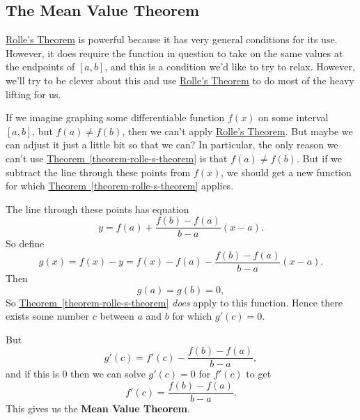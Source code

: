 \documentclass[10pt,]{book}
\newcommand{\terminology}[1]{\textbf{#1}}
\numberwithin{equation}{section}
\begin{document}
\subsection[{The Mean Value Theorem}]{The Mean Value Theorem}\label{subsection-the-mean-value-theorem}
\hypertarget{p-334}{}%
\hyperref[theorem-rolle-s-theorem]{Rolle's Theorem} is powerful because it has very general conditions for its use. However, it does require the function in question to take on the same values at the endpoints of \([a,b]\), and this is a condition we'd like to try to relax. However, we'll try to be clever about this and use \hyperref[theorem-rolle-s-theorem]{Rolle's Theorem} to do most of the heavy lifting for us.%
\par
\hypertarget{p-335}{}%
If we imagine graphing some differentiable function \(f(x)\) on some interval \([a,b]\), but \(f(a)\neq f(b)\), then we can't apply \hyperref[theorem-rolle-s-theorem]{Rolle's Theorem}. But maybe we can adjust it just a little bit so that we can? In particular, the only reason we can't use \hyperref[theorem-rolle-s-theorem]{Theorem~\ref{theorem-rolle-s-theorem}} is that \(f(a)\neq f(b)\). But if we subtract the line through these points from \(f(x)\), we should get a new function for which \hyperref[theorem-rolle-s-theorem]{Theorem~\ref{theorem-rolle-s-theorem}} applies.%
\par
\hypertarget{p-336}{}%
The line through these points has equation%
\begin{equation*}
y = f(a) + \frac{f(b) - f(a)}{b-a}(x-a).
\end{equation*}
So define%
\begin{equation*}
g(x) = f(x) - y = f(x) - f(a) - \frac{f(b) - f(a)}{b-a}(x-a).
\end{equation*}
Then%
\begin{equation*}
g(a) = g(b) = 0,
\end{equation*}
So \hyperref[theorem-rolle-s-theorem]{Theorem~\ref{theorem-rolle-s-theorem}} \emph{does} apply to this function. Hence there exists some number \(c\) between \(a\) and \(b\) for which \(g'(c) = 0\).%
\par
\hypertarget{p-337}{}%
But%
\begin{equation*}
g'(c) = f'(c) - \frac{f(b) - f(a)}{b-a},
\end{equation*}
and if this is \(0\) then we can solve \(g'(c) = 0\) for \(f'(c)\) to get%
\begin{equation*}
f'(c) = \frac{f(b) - f(a)}{b-a}.
\end{equation*}
This gives us the \terminology{Mean Value Theorem}.%
\end{document}
